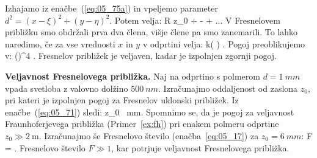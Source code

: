 Izhajamo iz enačbe~(\ref{eq:05_75a}) in 
vpeljemo parameter $d^2 = (x-\xi)^2+(y-\eta)^2$. Potem velja:
\beq
R \approx z_0 +  -  + ...
\label{eq:05_69}
\eeq
V Fresnelovem približku smo obdržali prva dva člena, višje člene pa 
smo zanemarili. To lahko naredimo, če za vse vrednosti $x$ in $y$ v odprtini velja:
\beq
k\left( \right) \pi.
\label{eq:05_70}
\eeq
Pogoj preoblikujemo v:
\beq
\left(\right)^4 \ll {}.
\label{eq:05_71}
\eeq
Fresnelov približek je veljaven, kadar je izpolnjen zgornji pogoj.
\begin{example}{\bf Veljavnost Fresnelovega približka.}
Naj na odprtino s polmerom $d=1~\si{mm}$ vpada svetloba
z valovno dolžino $500~\si{nm}$. Izračunajmo oddaljenost
od zaslona $z_0$, pri kateri je izpolnjen pogoj za Fresnelov
uklonski približek. Iz enačbe~(\ref{eq:05_71}) sledi:
\beq
z_0\gg {} ~\si{mm}.
\label{eq:05_73}
\eeq
Spomnimo se, da je pogoj za veljavnost Fraunhoferjevega
približka (Primer~\ref{ex:fh}) pri enakem polmeru odprtine 
$z_0 \gg 2~\si{\metre}$. 
Izračunajmo še Fresnelovo število (enačba~\ref{eq:05_17})
za $z_0=6~\si{mm}$:
\beq
F =  . 
\label{eq:05_74}
\eeq
Fresnelovo število $F\gg1$, kar potrjuje veljavnost Fresnelovega približka.
\end{example}

